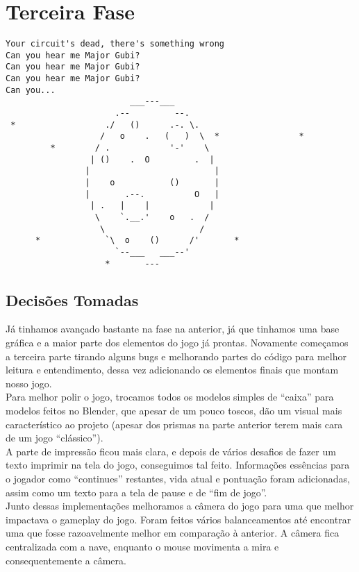 \documentclass[12pt,a4paper]{article}
\begin{document}
		
	\newpage	
	\section{Terceira Fase}
	\begin{verbatim}
Your circuit's dead, there's something wrong
Can you hear me Major Gubi?
Can you hear me Major Gubi?
Can you hear me Major Gubi?
Can you...             
                         ___---___
                      .--         --.
 *                  ./   ()      .-. \.
                   /   o    .   (   )  \  *                *
         *        / .            '-'    \
                 | ()    .  O         .  |
                |                         |
                |    o           ()       |
                |       .--.          O   |
                 | .   |    |            |
                  \    `.__.'    o   .  /
                   \                   /
      *             `\  o    ()      /'       *
                      `--___   ___--'
                    *       ---

	\end{verbatim}
  \subsection{Decisões Tomadas}
        Já tinhamos avançado bastante na fase na anterior, já que tinhamos uma base gráfica e a maior parte dos elementos do jogo já prontas. Novamente começamos a terceira parte tirando alguns bugs e melhorando partes do código para melhor leitura e entendimento, dessa vez adicionando os elementos finais que montam nosso jogo. \\
    
        Para melhor polir o jogo, trocamos todos os modelos simples de ``caixa'' para modelos feitos no Blender, que apesar de um pouco toscos, dão um visual mais característico ao projeto (apesar dos prismas na parte anterior terem mais cara de um jogo ``clássico'').\\
    
        A parte de impressão ficou mais clara, e depois de vários desafios de fazer um texto imprimir na tela do jogo, conseguimos tal feito. Informações essências para o jogador como ``continues'' restantes, vida atual e pontuação foram adicionadas, assim como um texto para a tela de pause e de ``fim de jogo''.\\
        
        Junto dessas implementações melhoramos a câmera do jogo para uma que melhor impactava o gameplay do jogo. Foram feitos vários balanceamentos até encontrar uma que fosse razoavelmente melhor em comparação à anterior. A câmera fica centralizada com a nave, enquanto o mouse movimenta a mira e consequentemente a câmera.\\
    
\end{document}
